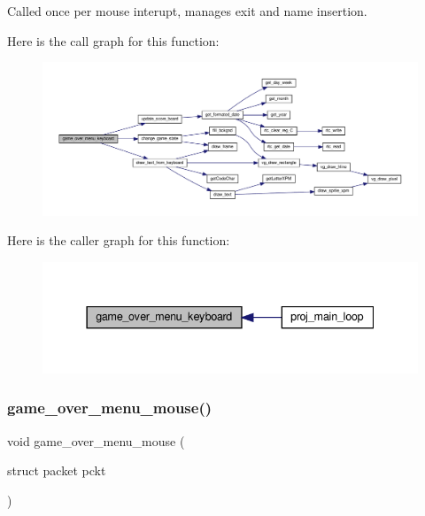 Called once per mouse interupt, manages exit and name insertion. 

Here is the call graph for this function\+:
\nopagebreak
\begin{figure}[H]
\begin{center}
\leavevmode
\includegraphics[width=350pt]{group__Game-Over-Menu_ga8a878da05a37cf4c3e82b28282dc5c47_cgraph}
\end{center}
\end{figure}
Here is the caller graph for this function\+:
\nopagebreak
\begin{figure}[H]
\begin{center}
\leavevmode
\includegraphics[width=337pt]{group__Game-Over-Menu_ga8a878da05a37cf4c3e82b28282dc5c47_icgraph}
\end{center}
\end{figure}
\mbox{\label{group__Game-Over-Menu_gae4cc6accba6062a3b5855bfc3826b215}} 
\subsubsection{\texorpdfstring{game\+\_\+over\+\_\+menu\+\_\+mouse()}{game\_over\_menu\_mouse()}}
{\footnotesize\ttfamily void game\+\_\+over\+\_\+menu\+\_\+mouse (\begin{DoxyParamCaption}\item[{struct packet}]{pckt }\end{DoxyParamCaption})}



